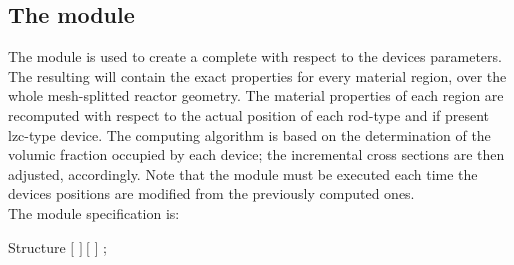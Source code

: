 \subsection{The  module}\label{sect:newmac}

\vskip 0.2cm
The  module is used to create a complete 
with respect to the devices parameters. The resulting  will
contain the exact properties for every material region, over the whole
mesh-splitted reactor geometry. The material properties of each region are
recomputed with respect to the actual position of each rod-type and if present
lzc-type device. The computing algorithm is based on the determination of the
volumic fraction occupied by each device; the incremental cross sections are then
adjusted, accordingly. Note that the  module must be executed
each time the devices positions are modified from the previously computed ones.\\

\noindent
The  module specification is:

\begin{DataStructure}{Structure }
  \moc{:=} 
  
\moc{::} $[$   $]~[$   $]$ ;
\end{DataStructure}

